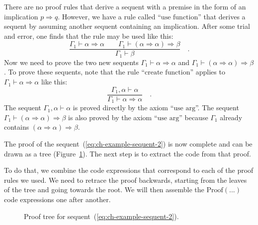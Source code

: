 There are no proof rules that derive a sequent with a premise in the
form of an implication $p\Rightarrow q$. However, we have a rule
called \textsf{``}$\text{use function}$\textsf{''} that derives a sequent by assuming
another sequent containing an implication. After some trial and error,
one finds that the rule may be used like this:
\[
\frac{\Gamma_{1}\vdash\alpha\Rightarrow\alpha\quad\quad\Gamma_{1}\vdash(\alpha\Rightarrow\alpha)\Rightarrow\beta}{\Gamma_{1}\vdash\beta}\quad.
\]
Now we need to prove the two new sequents $\Gamma_{1}\vdash\alpha\Rightarrow\alpha$
and $\Gamma_{1}\vdash(\alpha\Rightarrow\alpha)\Rightarrow\beta$.
To prove these sequents, note that the rule \textsf{``}$\text{create function}$\textsf{''}
applies to $\Gamma_{1}\vdash\alpha\Rightarrow\alpha$ like this:
\[
\frac{\Gamma_{1},\alpha\vdash\alpha}{\Gamma_{1}\vdash\alpha\Rightarrow\alpha}\quad.
\]
The sequent $\Gamma_{1},\alpha\vdash\alpha$ is proved directly by
the axiom \textsf{``}$\text{use arg}$\textsf{''}. The sequent $\Gamma_{1}\vdash(\alpha\Rightarrow\alpha)\Rightarrow\beta$
is also proved by the axiom \textsf{``}$\text{use arg}$\textsf{''} because $\Gamma_{1}$
already contains $(\alpha\Rightarrow\alpha)\Rightarrow\beta$.

The proof of the sequent~(\ref{eq:ch-example-sequent-2}) is now
complete and can be drawn as a tree (Figure~\ref{fig:Proof-of-the-sequent-example-2}).
The next step is to extract the code from that proof.

To do that, we combine the code expressions that correspond to each
of the proof rules we used. We need to retrace the proof backwards,
starting from the leaves of the tree and going towards the root. We
will then assemble the $\text{Proof}\left(...\right)$ code expressions
one after another.

\begin{figure}
\begin{centering}
{\footnotesize{}}%
\par\end{centering}
\caption{Proof tree for sequent~(\ref{eq:ch-example-sequent-2}).\label{fig:Proof-of-the-sequent-example-2}}
\end{figure}

